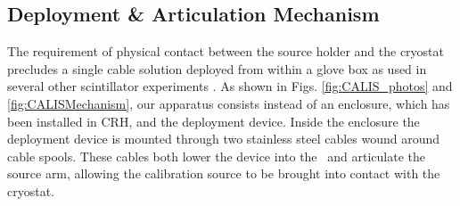 \subsection{Deployment \& Articulation Mechanism}\label{sec:DeploymentArticulation}
The requirement of physical contact between the source holder and the cryostat precludes a single cable solution deployed from within a glove box as used in several other scintillator experiments \cite{Banks:2014hra, Huang:2013uxa}. %
As shown in Figs. \ref{fig:CALIS_photos} and \ref{fig:CALISMechanism}, our apparatus consists instead of an enclosure, which has been installed in CRH, and the deployment device. Inside the enclosure the deployment device is mounted through two stainless steel cables wound around cable spools. These cables both lower the device into the \lsv\ and articulate the source arm, allowing the calibration source to be brought into contact with the cryostat.
